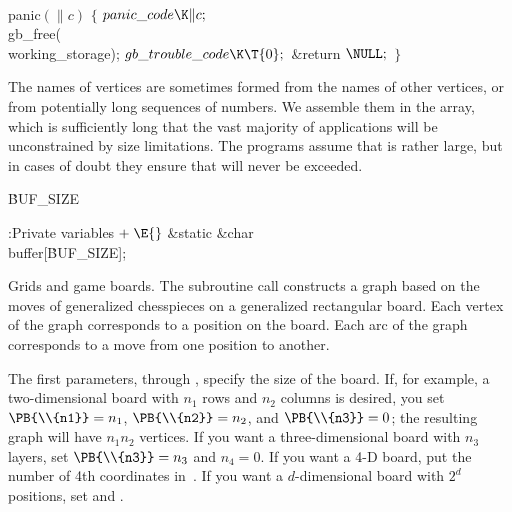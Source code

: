 \Y\B\4\D\\{panic}$(\|c)$\6
${}\{{}$\5
\1${}\\{panic\_code}\K\|c;{}$\6
\\{gb\_free}(\\{working\_storage});\6
${}\\{gb\_trouble\_code}\K\T{0};{}$\6
\&{return} ${}\NULL;{}$\6
\4${}\}{}$\2\par
\fi

The names of vertices are sometimes formed from the names of other
vertices, or from potentially long sequences of numbers. We assemble
them in the  array, which is sufficiently long that the
vast majority of applications will be unconstrained by size limitations.
The programs assume that  is rather large, but in cases of
doubt they ensure that  will never be exceeded.

\Y\B\4\D\.{BUF\_SIZE}\5
\par
\Y\B\4:Private variables\X${}\mathrel+\E{}$\6
\&{static} \&{char} \\{buffer}[\.{BUF\_SIZE}];\par
\fi

Grids and game boards. The subroutine call
constructs a graph based on the moves of generalized chesspieces on a
generalized rectangular board. Each vertex of the graph corresponds to a
position on the board. Each arc of the graph corresponds to a move from
one position to another.

The first parameters,  through , specify the size of the
board.
If, for example, a two-dimensional board with $n_1$ rows and $n_2$ columns
is desired, you set $\PB{\\{n1}}=n_1$, $\PB{\\{n2}}=n_2$, and $\PB{\\{n3}}=0$;
the resulting
graph will have $n_1n_2$ vertices. If you want a three-dimensional
board with $n_3$ layers, set $\PB{\\{n3}}=n_3$ and $n_4=0$. If you want
a 4-{\mc D} board, put the number of 4th coordinates in~.
If you want a $d$-dimensional board with $2^d$ positions, set 
and .

